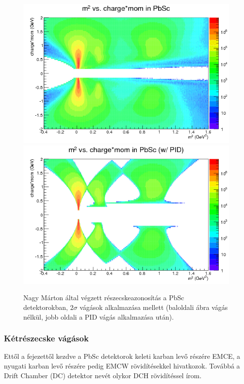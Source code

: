 \documentclass[11pt,a4paper]{article}
\numberwithin{equation}{subsection}
\numberwithin{figure}{section}
\begin{document}
\begin{figure}[H]
\centering
\includegraphics[scale=0.39]{pic/dat/nm/h_m2sum_pbsc_all.png}
\includegraphics[scale=0.39]{pic/dat/nm/h_m2sum_pbsc_pid.png}
\caption{Nagy Márton által végzett részecskeazonosítás a PbSc detektorokban, $2\sigma$ vágások alkalmazása mellett (baloldali ábra vágás nélkül, jobb oldali a PID vágás alkalmazása után).}
\label{fig:m2sum1}
\end{figure}

\subsubsection{Kétrészecske vágások}

Ettől a fejezettől kezdve a PbSc detektorok keleti karban levő részére EMCE, a nyugati karban levő részére pedig EMCW rövidítésekkel hivatkozok. Továbbá a Drift Chamber (DC) detektor nevét olykor DCH rövidítéssel írom.
\end{document}
